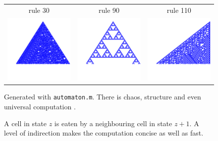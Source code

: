 \documentclass{beamer}
\begin{document}
\begin{frame}[t]{}
\begin{multicols}{5}
\begin{figure}
\begin{tabular}{ccc}
rule 30 & rule 90 & rule 110 \\
\includegraphics[width=0.3\hsize]{r30.png} & 
\includegraphics[width=0.3\hsize]{r90.png} & 
\includegraphics[width=0.3\hsize]{r110.png} 
\end{tabular}
\caption{Generated with \texttt{automaton.m}. There is chaos, structure and even
universal computation \cite{rule110}.}
\end{figure}

\begin{figure}
\caption{A cell in state $z$ is eaten by a neighbouring cell in state $z+1$.
A level of indirection makes the computation concise as well as fast. }
\end{figure}


\end{multicols}
\end{frame}
\end{document}
